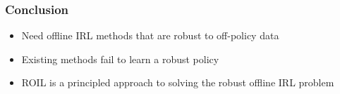 \documentclass{beamer}
\begin{document}
\begin{frame}
	\frametitle{Conclusion}
	\begin{itemize}
		\item Need offline IRL methods that are robust to off-policy data
		\vfill
		\item Existing methods fail to learn a robust policy
		\vfill
		\item ROIL is a principled approach to solving the robust offline IRL problem
	\end{itemize}
\end{frame}
\end{document}
